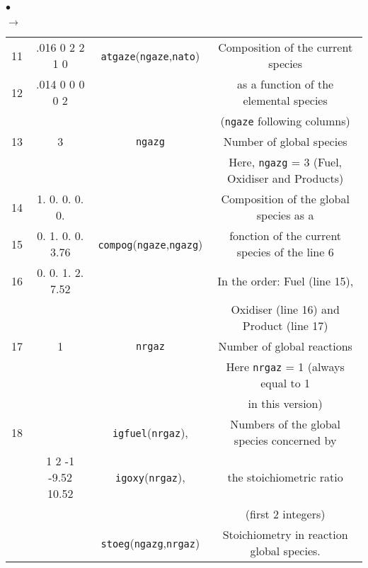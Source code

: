 {{{\begin{list}{$\bullet$}{}
\begin{list}{$\rightarrow$}{}
\begin{table}[htbp]
\begin{center}
{\begin{tabular}{|c|c|c|c|}
 11     &.016  0  2  2  1  0&\texttt{atgaze\index{atgaze}}(\texttt{ngaze},\texttt{nato})& Composition of the current species             \\
 12     &.014  0  0  0  0  2&                              & as a function of the elemental species           \\
        &                   &                              & (\texttt{ngaze} following columns)                        \\ \hline
 13     &         3         &  \texttt{ngazg\index{ngazg}} & Number of global species                         \\
        &                   &                              & Here, \texttt{ngazg} = 3 (Fuel, Oxidiser and Products)    \\ \hline
 14     &  1. 0. 0. 0. 0.   &                              & Composition of the global species as a           \\
 15     &  0. 1. 0. 0. 3.76 &\texttt{compog\index{compog}}(\texttt{ngaze},\texttt{ngazg})& fonction of the current species of the line 6 \\
 16     &  0. 0. 1. 2. 7.52 &                              & In the order: Fuel (line 15),                    \\
        &                   &                              & Oxidiser (line 16) and Product (line 17)         \\ \hline
 17     &         1         &  \texttt{nrgaz\index{nrgaz}} & Number of global reactions                       \\
        &                   &                              & Here \texttt{nrgaz} = 1 (always equal to 1                \\
        &                   &                              & in this version)                                 \\ \hline
 18     &                   & \texttt{igfuel\index{igfuel}}(\texttt{nrgaz}), & Numbers of the global species concerned by       \\
        & 1 2 -1 -9.52 10.52&  \texttt{igoxy\index{igoxy}}(\texttt{nrgaz}),  & the stoichiometric ratio                         \\
        &                   &                              & (first 2 integers)                               \\
        &                   &\texttt{stoeg\index{stoeg}}(\texttt{ngazg},\texttt{nrgaz})& Stoichiometry in reaction global species.       \\

\end{tabular}}
\end{center}
\end{table}
\end{list}
\end{list}}}}
